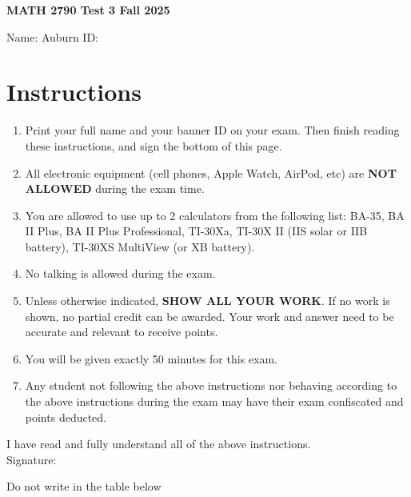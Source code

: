 \documentclass[12pt]{article}
\begin{document}
\begin{center}
    \Large \textbf{MATH 2790 Test 3 Fall 2025} \\[1em]
\end{center}

\vspace{.25cm}

\noindent Name: \underline{\hspace{8cm}} \hspace{.25cm} Auburn ID: \underline{\hspace{4cm}}



\section*{Instructions}
\begin{enumerate}[label=\arabic*.]
\item Print your full name and your banner ID on your exam. Then finish reading these instructions, and sign the bottom of this page.
\item All electronic equipment (cell phones, Apple Watch, AirPod, etc) are \textbf{NOT ALLOWED} during the exam time.
\item You are allowed to use up to 2 calculators from the following list: BA-35, BA II Plus, BA II Plus Professional, TI-30Xa, TI-30X II (IIS solar or IIB battery), TI-30XS MultiView (or XB battery).
\item No talking is allowed during the exam.
\item Unless otherwise indicated, \textbf{SHOW ALL YOUR WORK}. If no work is shown, no partial credit can be awarded. Your work and answer need to be accurate and relevant to receive points.
\item You will be given exactly 50 minutes for this exam.
\item Any student not following the above instructions nor behaving according to the above instructions during the exam may have their exam confiscated and points deducted.
\end{enumerate}

I have read and fully understand all of the above instructions. \\[2em]
Signature: \hrulefill


\vspace{.75cm}
Do not write in the table below
\end{document}
